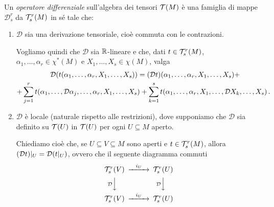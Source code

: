 \begin{definition} 
	Un \emph{operatore differenziale} sull'algebra dei tensori $\mathcal T(M)$ è una famiglia di mappe $\mathcal D_s^r$ da $\mathcal T_s^r(M)$ in sé tale che:
	\begin{enumerate}
	 \item $\mathcal D$ sia una derivazione tensoriale, cioè commuta con le contrazioni. %
	 
	 Vogliamo quindi che $\mathcal D$ sia $\mathbb R$-lineare e che, dati $t\in\mathcal T_s^r(M)$, $\alpha_1,\ldots,\alpha_r\in\chi^*(M)$ e $X_1,\ldots,X_s\in\chi(M)$, valga
	 \begin{multline*}
	 	\mathcal D (t(\alpha_1,\ldots,\alpha_r,X_1,\ldots,X_s)) = (\mathcal D t) (\alpha_1,\ldots,\alpha_r,X_1,\ldots,X_s) +\\
	 	+\sum_{j=1}^r t(\alpha_1,\ldots,\mathcal D \alpha_j,\ldots, \alpha_r, X_1,\ldots, X_s) +
	 	\sum_{k=1}^s t(\alpha_1,\ldots, \alpha_r, X_1,\ldots, \mathcal D X_k,\ldots, X_s) \, \text{. }
	 \end{multline*}

	\item $\mathcal D$ è locale (naturale rispetto alle restrizioni), dove supponiamo che $\mathcal D$ sia definito su $\mathcal T(U)$ in $\mathcal T(U)$ per ogni $U\subseteq M$ aperto. %
	
	Chiediamo cioè che, se $U\subseteq V \subseteq M$ sono aperti e $t\in\mathcal T_s^r(M)$, allora $(\mathcal D t)|_ U = \mathcal D (t|_ U)$, ovvero che il seguente diagramma commuti
	\begin{equation*}
	\begin{CD} 
	 \Tau_s^r(V) @>i_U>> \Tau_s^r(U) \\
	 @V\mathcal{D}VV  @V\mathcal{D}VV \\
	 \Tau_s^r(V) @>i_U>> \Tau_s^r(U) 
	\end{CD}
	\end{equation*}

	\end{enumerate}
\end{definition}

